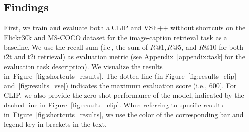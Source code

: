 \subsection{Findings}
First, we train and evaluate both a CLIP and VSE++  without shortcuts on the \ac{Flickr30k} and \ac{MS-COCO} dataset for the image-caption retrieval task as a baseline. 
We use the recall sum (i.e., the sum of $R@1, R@5$, and $R@10$ for both \ac{i2t} and \ac{t2i} retrieval) as evaluation metric (see Appendix~\ref{appendix:task} for the evaluation task description). 
We visualize the results in~Figure~\ref{fig:shortcuts_results}.
The dotted line (in Figure~\ref{fig:results_clip} and~\ref{fig:results_vse}) indicates the maximum evaluation score (i.e., 600). 
For CLIP, we also provide the zero-shot performance of the model, indicated by the dashed line in Figure~\ref{fig:results_clip}. 
When referring to specific results in~Figure~\ref{fig:shortcuts_results}, we use the color of the corresponding bar and legend key in brackets in the text.


